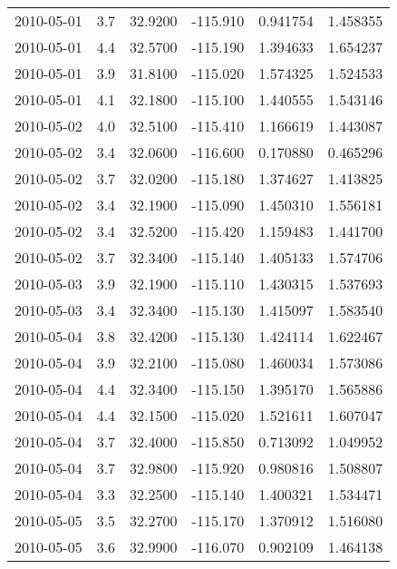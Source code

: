 \begin{tabular}{lrrrrr}
2010-05-01 &       3.7 &  32.9200 &  -115.910 &         0.941754 &         1.458355 \\
2010-05-01 &       4.4 &  32.5700 &  -115.190 &         1.394633 &         1.654237 \\
2010-05-01 &       3.9 &  31.8100 &  -115.020 &         1.574325 &         1.524533 \\
2010-05-01 &       4.1 &  32.1800 &  -115.100 &         1.440555 &         1.543146 \\
2010-05-02 &       4.0 &  32.5100 &  -115.410 &         1.166619 &         1.443087 \\
2010-05-02 &       3.4 &  32.0600 &  -116.600 &         0.170880 &         0.465296 \\
2010-05-02 &       3.7 &  32.0200 &  -115.180 &         1.374627 &         1.413825 \\
2010-05-02 &       3.4 &  32.1900 &  -115.090 &         1.450310 &         1.556181 \\
2010-05-02 &       3.4 &  32.5200 &  -115.420 &         1.159483 &         1.441700 \\
2010-05-02 &       3.7 &  32.3400 &  -115.140 &         1.405133 &         1.574706 \\
2010-05-03 &       3.9 &  32.1900 &  -115.110 &         1.430315 &         1.537693 \\
2010-05-03 &       3.4 &  32.3400 &  -115.130 &         1.415097 &         1.583540 \\
2010-05-04 &       3.8 &  32.4200 &  -115.130 &         1.424114 &         1.622467 \\
2010-05-04 &       3.9 &  32.2100 &  -115.080 &         1.460034 &         1.573086 \\
2010-05-04 &       4.4 &  32.3400 &  -115.150 &         1.395170 &         1.565886 \\
2010-05-04 &       4.4 &  32.1500 &  -115.020 &         1.521611 &         1.607047 \\
2010-05-04 &       3.7 &  32.4000 &  -115.850 &         0.713092 &         1.049952 \\
2010-05-04 &       3.7 &  32.9800 &  -115.920 &         0.980816 &         1.508807 \\
2010-05-04 &       3.3 &  32.2500 &  -115.140 &         1.400321 &         1.534471 \\
2010-05-05 &       3.5 &  32.2700 &  -115.170 &         1.370912 &         1.516080 \\
2010-05-05 &       3.6 &  32.9900 &  -116.070 &         0.902109 &         1.464138 \\

\end{tabular}
